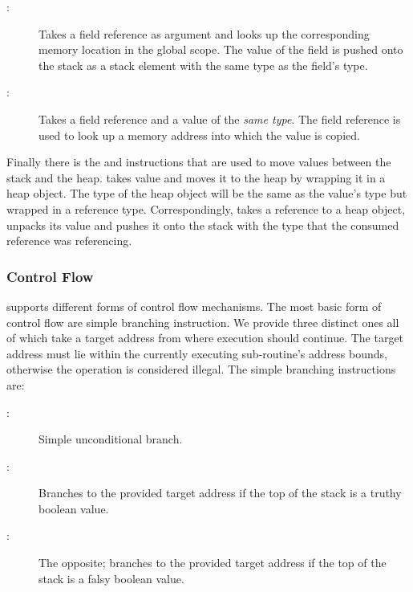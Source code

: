 \begin{description}

\item[:]

  Takes a field reference as argument and looks up the corresponding memory
  location in the global scope. The value of the field is pushed onto the stack
  as a stack element with the same type as the field's type.

\item[:]

  Takes a field reference and a value of the \emph{same type}. The field
  reference is used to look up a memory address into which the value is copied.

\end{description}

Finally there is the  and  instructions that are used to
move values between the stack and the heap.  takes value and moves it
to the heap by wrapping it in a heap object. The type of the heap object will be
the same as the value's type but wrapped in a reference type. Correspondingly,
 takes a reference to a heap object, unpacks its value and pushes
it onto the stack with the type that the consumed reference was referencing.

\subsubsection{Control Flow}
\label{sec:design:isa:control-flow}

\thename{} supports different forms of control flow mechanisms. The most basic
form of control flow are simple branching instruction. We provide three distinct
ones all of which take a target address from where execution should
continue. The target address must lie within the currently executing
sub-routine's address bounds, otherwise the operation is considered illegal. The
simple branching instructions are:

\begin{description}

\item[:]

  Simple unconditional branch.

\item[:]

  Branches to the provided target address if the top of the stack is a truthy
  boolean value.

\item[:]

  The opposite; branches to the provided target address if the top of the stack
  is a falsy boolean value.

\end{description}

